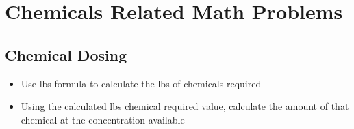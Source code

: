 







\section{Chemicals Related Math Problems}
\subsection{Chemical Dosing}

\begin{itemize}
\item Use lbs formula to calculate the lbs of chemicals required\\
\item Using the calculated lbs chemical required value, calculate the amount of that chemical at the concentration available
\end{itemize}

